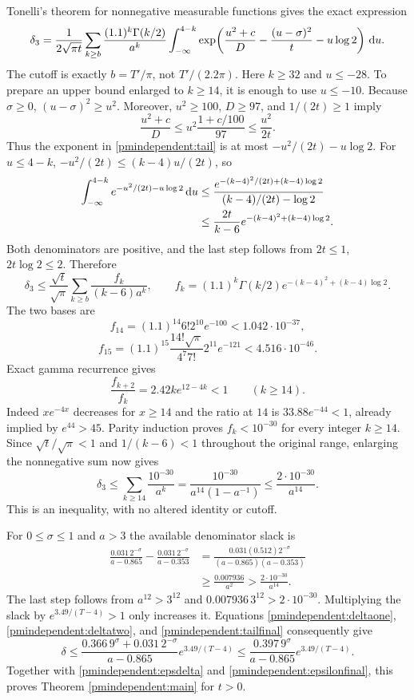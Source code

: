 Tonelli's theorem for nonnegative measurable functions gives the
exact expression
\begin{equation}\label{pmindependent:tail}
 \delta_3=\frac1{2\sqrt{\pi t}}
 \sum_{k\ge b}\frac{(1.1)^k\Gamma(k/2)}{a^k}
 \int_{-\infty}^{4-k}
 \exp\!\left(\frac{u^2+c}D-\frac{(u-\sigma)^2}t-u\log2\right)\,\mathrm d u.
\end{equation}
The cutoff is exactly $b=T'/\pi$, not $T'/(2.2\pi)$.
Here $k\ge32$ and $u\le-28$. To prepare an upper bound enlarged
to $k\ge14$, it is enough to use $u\le-10$. Because $\sigma\ge0$,
$(u-\sigma)^2\ge u^2$. Moreover, $u^2\ge100$, $D\ge97$,
and $1/(2t)\ge1$ imply
\[
 \frac{u^2+c}D
 \le u^2\frac{1+c/100}{97}\le\frac{u^2}{2t}.
\]
Thus the exponent in \eqref{pmindependent:tail} is at most
$-u^2/(2t)-u\log2$. For $u\le4-k$,
$-u^2/(2t)\le(k-4)u/(2t)$, so
\begin{align*}
 \int_{-\infty}^{4-k}e^{-u^2/(2t)-u\log2}\,\mathrm d u
 &\le\frac{e^{-(k-4)^2/(2t)+(k-4)\log2}}
                {(k-4)/(2t)-\log2}\\
 &\le\frac{2t}{k-6}e^{-(k-4)^2+(k-4)\log2}.
\end{align*}
Both denominators are positive, and the last step follows from
$2t\le1$, $2t\log2\le2$. Therefore
\[
 \delta_3\le\frac{\sqrt t}{\sqrt\pi}
 \sum_{k\ge b}\frac{f_k}{(k-6)a^k},\qquad
 f_k=(1.1)^k\Gamma(k/2)e^{-(k-4)^2+(k-4)\log2}.
\]
The two bases are
\[
 f_{14}=(1.1)^{14}6!2^{10}e^{-100}<1.042\cdot10^{-37},
\]
\[
 f_{15}=(1.1)^{15}\frac{14!\sqrt\pi}{4^7 7!}2^{11}e^{-121}
                                         <4.516\cdot10^{-46}.
\]
Exact gamma recurrence gives
\[
 \frac{f_{k+2}}{f_k}=2.42k e^{12-4k}<1\qquad(k\ge14).
\]
Indeed $x e^{-4x}$ decreases for $x\ge14$ and the ratio at $14$
is $33.88e^{-44}<1$, already implied by $e^{44}>45$.
Parity induction proves $f_k<10^{-30}$ for every integer $k\ge14$.
Since $\sqrt t/\sqrt\pi<1$ and $1/(k-6)<1$ throughout the
original range, enlarging the nonnegative sum now gives
\begin{equation}\label{pmindependent:tailfinal}
 \delta_3\le\sum_{k\ge14}\frac{10^{-30}}{a^k}
 =\frac{10^{-30}}{a^{14}(1-a^{-1})}
 \le\frac{2\cdot10^{-30}}{a^{14}}.
\end{equation}
This is an inequality, with no altered identity or cutoff.

For $0\le\sigma\le1$ and $a>3$ the available denominator slack is
\begin{align*}
 \frac{0.031\,2^{-\sigma}}{a-0.865}
 -\frac{0.031\,2^{-\sigma}}{a-0.353}
 &=\frac{0.031(0.512)2^{-\sigma}}
          {(a-0.865)(a-0.353)}\\
 &\ge\frac{0.007936}{a^2}
 >\frac{2\cdot10^{-30}}{a^{14}}.
\end{align*}
The last step follows from $a^{12}>3^{12}$ and
$0.007936\,3^{12}>2\cdot10^{-30}$. Multiplying the slack by
$e^{3.49/(T-4)}>1$ only increases it. Equations \eqref{pmindependent:deltaone},
\eqref{pmindependent:deltatwo}, and \eqref{pmindependent:tailfinal} consequently give
\[
 \delta\le\frac{0.366\,9^\sigma+0.031\,2^{-\sigma}}{a-0.865}
                       e^{3.49/(T-4)}
 \le\frac{0.397\,9^\sigma}{a-0.865}e^{3.49/(T-4)}.
\]
Together with \eqref{pmindependent:epsdelta} and \eqref{pmindependent:epsilonfinal}, this proves
Theorem \ref{pmindependent:main} for $t>0$.

